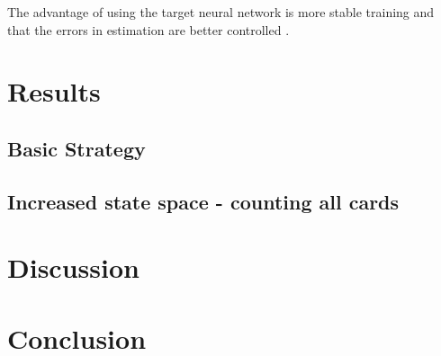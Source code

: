 \documentclass[conference]{IEEEtran}
\begin{document}
The advantage of using the target neural network is more stable training and that the errors in estimation are better controlled \cite{b6}.



\section{Results}

\subsection{Basic Strategy}

\subsection{Increased state space - counting all cards}

\section{Discussion}


\section{Conclusion}
\end{document}
